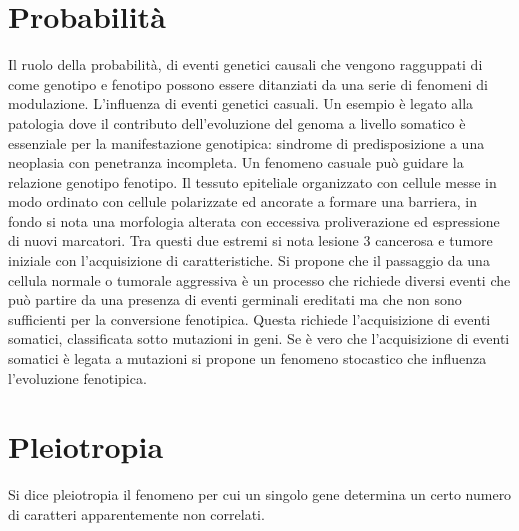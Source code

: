 \section{Probabilit\`a}
Il ruolo della probabilit\`a, di eventi genetici causali che vengono ragguppati di come genotipo e fenotipo possono essere ditanziati da una serie di fenomeni di modulazione. L'influenza
di eventi genetici casuali. Un esempio \`e legato alla patologia dove il contributo dell'evoluzione del genoma a livello somatico \`e essenziale per la manifestazione genotipica: 
sindrome di predisposizione a una neoplasia con penetranza incompleta. Un fenomeno casuale pu\`o guidare la relazione genotipo fenotipo. Il tessuto epiteliale organizzato con cellule
messe in modo ordinato con cellule polarizzate ed ancorate a formare una barriera, in fondo si nota una morfologia alterata con eccessiva proliverazione ed espressione di nuovi 
marcatori. Tra questi due estremi si nota lesione $3$ cancerosa e tumore iniziale con l'acquisizione di caratteristiche. Si propone che il passaggio da una cellula normale o tumorale
aggressiva \`e un processo che richiede diversi eventi che pu\`o partire da una presenza di eventi germinali ereditati ma che non sono sufficienti per la conversione fenotipica. 
Questa richiede l'acquisizione di eventi somatici, classificata sotto mutazioni in geni. Se \`e vero che l'acquisizione di eventi somatici \`e legata a mutazioni si propone un fenomeno
stocastico che influenza l'evoluzione fenotipica. 
\section{Pleiotropia}
Si dice pleiotropia il fenomeno per cui un singolo gene determina un certo numero di caratteri apparentemente non correlati.
